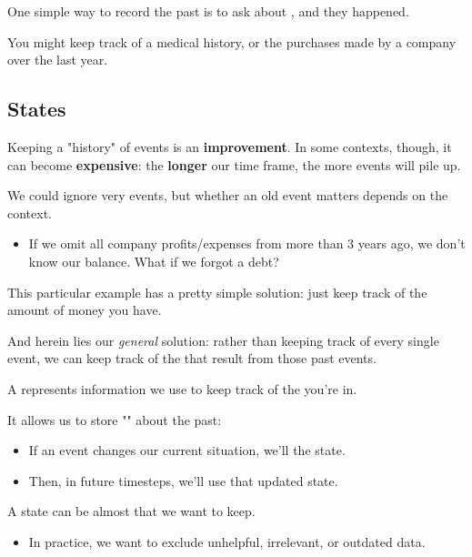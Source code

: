         \begin{concept}
            One simple way to record the past is to ask about , and  they happened.
        \end{concept}

        \miniex You might keep track of a medical history, or the purchases made by a company over the last year.


    \phantom{}

    \subsection{States}

        Keeping a "history" of events is an \textbf{improvement}. In some contexts, though, it can become \textbf{expensive}: the \textbf{longer} our time frame, the more events will pile up.

        We could ignore very  events, but whether an old event matters depends on the context.

        \begin{itemize}
            \item \miniex If we omit all company profits/expenses from more than 3 years ago, we don't know our balance. What if we forgot a debt?
        \end{itemize}

        This particular example has a pretty simple solution: just keep track of the  amount of money you have.

        And herein lies our \textit{general} solution: rather than keeping track of every single event, we can keep track of the  that result from those past events.\\

        \begin{definition}
            A  represents information we use to keep track of the  you're in.
            
            It allows us to store "" about the past:

            \begin{itemize}
                \item If an event changes our current situation, we'll  the state.
                \item Then, in future timesteps, we'll use that updated state.
            \end{itemize}

            \subsecdiv
            
            A state can be almost  that we want to keep.

            \begin{itemize}
                \item In practice, we want to exclude unhelpful, irrelevant, or outdated data.
            \end{itemize}
        \end{definition}

